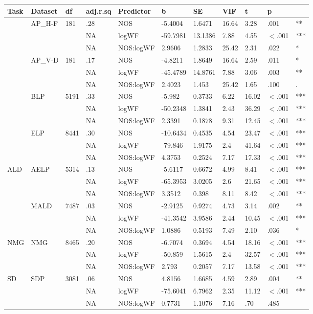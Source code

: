 \begin{table}[ht]
\centering
\begingroup\normalsize
\begin{tabular}{lllllllllll}
  \hline
Task & Dataset & df & adj.r.sq & Predictor & b & SE & VIF & t & p &  \\ 
  \hline
 & AP\_H-F & 181 & .28 & NOS & -5.4004 & 1.6471 & 16.64 & 3.28 & .001 & ** \\ 
   &  &  & NA & logWF & -59.7981 & 13.1386 & 7.88 & 4.55 & $<$.001 & *** \\ 
   &  &  & NA & NOS:logWF & 2.9606 & 1.2833 & 25.42 & 2.31 & .022 & * \\ 
   & AP\_V-D & 181 & .17 & NOS & -4.8211 & 1.8649 & 16.64 & 2.59 & .011 & * \\ 
   &  &  & NA & logWF & -45.4789 & 14.8761 & 7.88 & 3.06 & .003 & ** \\ 
   &  &  & NA & NOS:logWF & 2.4023 & 1.453 & 25.42 & 1.65 & .100 & . \\ 
   & BLP & 5191 & .33 & NOS & -5.982 & 0.3733 & 6.22 & 16.02 & $<$.001 & *** \\ 
   &  &  & NA & logWF & -50.2348 & 1.3841 & 2.43 & 36.29 & $<$.001 & *** \\ 
   &  &  & NA & NOS:logWF & 2.3391 & 0.1878 & 9.31 & 12.45 & $<$.001 & *** \\ 
   & ELP & 8441 & .30 & NOS & -10.6434 & 0.4535 & 4.54 & 23.47 & $<$.001 & *** \\ 
   &  &  & NA & logWF & -79.846 & 1.9175 & 2.4 & 41.64 & $<$.001 & *** \\ 
   &  &  & NA & NOS:logWF & 4.3753 & 0.2524 & 7.17 & 17.33 & $<$.001 & *** \\ 
  ALD & AELP & 5314 & .13 & NOS & -5.6117 & 0.6672 & 4.99 & 8.41 & $<$.001 & *** \\ 
   &  &  & NA & logWF & -65.3953 & 3.0205 & 2.6 & 21.65 & $<$.001 & *** \\ 
   &  &  & NA & NOS:logWF & 3.3512 & 0.398 & 8.11 & 8.42 & $<$.001 & *** \\ 
   & MALD & 7487 & .03 & NOS & -2.9125 & 0.9274 & 4.73 & 3.14 & .002 & ** \\ 
   &  &  & NA & logWF & -41.3542 & 3.9586 & 2.44 & 10.45 & $<$.001 & *** \\ 
   &  &  & NA & NOS:logWF & 1.0886 & 0.5193 & 7.49 & 2.10 & .036 & * \\ 
  NMG & NMG & 8465 & .20 & NOS & -6.7074 & 0.3694 & 4.54 & 18.16 & $<$.001 & *** \\ 
   &  &  & NA & logWF & -50.859 & 1.5615 & 2.4 & 32.57 & $<$.001 & *** \\ 
   &  &  & NA & NOS:logWF & 2.793 & 0.2057 & 7.17 & 13.58 & $<$.001 & *** \\ 
  SD & SDP & 3081 & .06 & NOS & 4.8156 & 1.6685 & 4.59 & 2.89 & .004 & ** \\ 
   &  &  & NA & logWF & -75.6041 & 6.7962 & 2.35 & 11.12 & $<$.001 & *** \\ 
   &  &  & NA & NOS:logWF & 0.7731 & 1.1076 & 7.16 & .70 & .485 &   \\ 
   \hline
\end{tabular}
\endgroup
\end{table}
